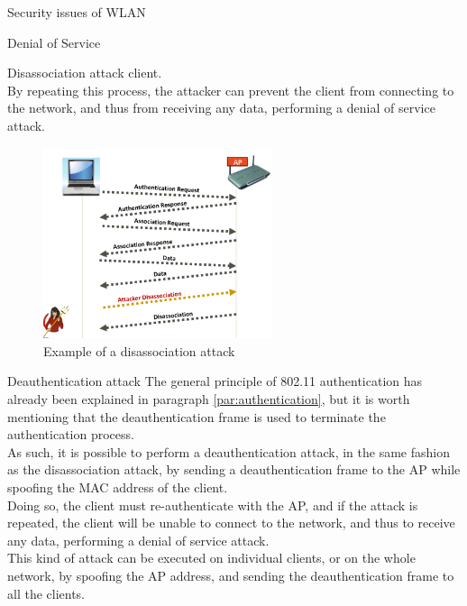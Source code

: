 \begin{section}{Security issues of WLAN}
\begin{subsection}{Denial of Service}
\begin{subsubsection}{Disassociation attack}
      client.\\
      By repeating this process, the attacker can prevent the client from connecting to the network, and
      thus from receiving any data, performing a denial of service attack.
      \begin{figure}[h]
        \centering
        \includegraphics[width=0.6\textwidth]{img/wireless/disassociation attack.png}
        \caption{Example of a disassociation attack}
      \end{figure}

    \end{subsubsection}
    \begin{subsubsection}{Deauthentication attack}
      The general principle of 802.11 authentication has already been explained in paragraph
      \ref{par:authentication}, but it is worth mentioning that the deauthentication frame is used to
      terminate the authentication process.\\
      As such, it is possible to perform a deauthentication attack, in the same fashion as the
      disassociation attack, by sending a deauthentication frame to the AP while spoofing the MAC address
      of the client.\\
      Doing so, the client must re-authenticate with the AP, and if the attack is repeated, the client
      will be unable to connect to the network, and thus to receive any data, performing a denial of
      service attack.\\
      This kind of attack can be executed on individual clients, or on the whole network, by spoofing
      the AP address, and sending the deauthentication frame to all the clients.


\end{subsubsection}
\end{subsection}
\end{section}
